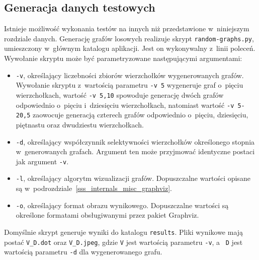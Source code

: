 \subsection*{Generacja danych testowych}
\par{
  Istnieje możliwość wykonania testów na innych niż przedstawione w~niniejszym rozdziale danych.
  Generację grafów losowych realizuje skrypt \texttt{random-graphs.py}, umieszczony w~głównym katalogu aplikacji.
  Jest on wykonywalny z~linii poleceń.
  Wywołanie skryptu może być parametryzowane następującymi argumentami:
  \begin{itemize}
    \item \texttt{-v}, określający liczebności zbiorów wierzchołków wygenerowanych grafów.
      Wywołanie skryptu z~wartością parametru \texttt{-v 5} wygeneruje graf o~pięciu wierzchołkach, wartość \texttt{-v 5,10} spowoduje generację dwóch grafów odpowiednio o~pięciu i~dziesięciu wierzchołkach, natomiast wartość \texttt{-v 5-20,5} zaowocuje generacją czterech grafów odpowiednio o~pięciu, dziesięciu, piętnastu oraz dwudziestu wierzchołkach.
    \item \texttt{-d}, określający współczynnik selektywności wierzchołków określonego stopnia w~generowanych grafach.
      Argument ten może przyjmować identyczne postaci jak argument \texttt{-v}.
    \item \texttt{-l}, określający algorytm wizualizacji grafów. Dopuszczalne wartości opisane są w~podrozdziale~\ref{sss_internals_misc_graphviz}.
    \item \texttt{-o}, określający format obrazu wynikowego. Dopuszczalne wartości są określone formatami obsługiwanymi przez pakiet Graphviz.
  \end{itemize}

  Domyślnie skrypt generuje wyniki do katalogu \texttt{results}.
  Pliki wynikowe mają postać \texttt{V\_D.dot} oraz \texttt{V\_D.jpeg}, gdzie \texttt{V} jest wartością parametru \texttt{-v}, a~ \texttt{D} jest wartością parametru \texttt{-d} dla wygenerowanego grafu.
}
